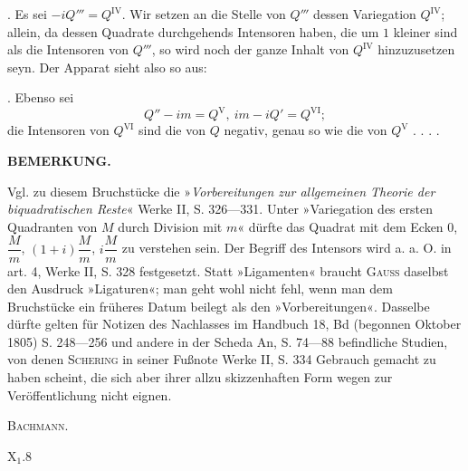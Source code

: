 \par{}. Es sei $-iQ'''=Q^{\mathrm{IV}}$. Wir setzen an die Stelle von $Q'''$ dessen Variegation $Q^{\mathrm{IV}}$; allein, da dessen Quadrate durchgehends Intensoren haben, die um $1$ kleiner sind als die Intensoren von $Q'''$, so wird noch der ganze Inhalt von $Q^{\mathrm{IV}}$ hinzuzusetzen seyn. Der Apparat sieht also so aus:
\begin{center}
\end{center}
\par{}. Ebenso sei
\[
Q''-im=Q^{\mathrm{V}},\ im-iQ'=Q^{\mathrm{VI}};
\]
\noindent die Intensoren von $Q^{\mathrm{VI}}$ sind die von $Q$ negativ, genau so wie die von $Q^{\mathrm{V}}$ . . . .
\begin{center}\textbf{BEMERKUNG.}\end{center}
\begingroup\small
\par\indent Vgl. zu diesem Bruchstücke die »\textit{Vorbereitungen zur allgemeinen Theorie der biquadratischen Reste}« Werke II, S. 326—331. Unter »Variegation des ersten Quadranten von $M$ durch Division mit $m$« dürfte das Quadrat mit dem Ecken $0$, $\dfrac M m$, $(1+i)\dfrac M m$, $i\dfrac M m$ zu verstehen sein. Der Begriff des Intensors wird a. a. O. in art. 4, Werke II, S. 328 festgesetzt. Statt »Ligamenten« braucht \textsc{Gauss} daselbst den Ausdruck »Ligaturen«; man geht wohl nicht fehl, wenn man dem Bruchstücke ein früheres Datum beilegt als den »Vorbereitungen«. Dasselbe dürfte gelten für Notizen des Nachlasses im Handbuch 18, Bd (begonnen Oktober 1805) S. 248—256 und andere in der Scheda An, S. 74—88 befindliche Studien, von denen \textsc{Schering} in seiner Fußnote Werke II, S. 334 Gebrauch gemacht zu haben scheint, die sich aber ihrer allzu skizzenhaften Form wegen zur Veröffentlichung nicht eignen.
\begin{flushright}\textsc{Bachmann.}\end{flushright}
\ClosingRule
\vfill\noindent X$_1$.\hfill8\par
\clearpage\endgroup
